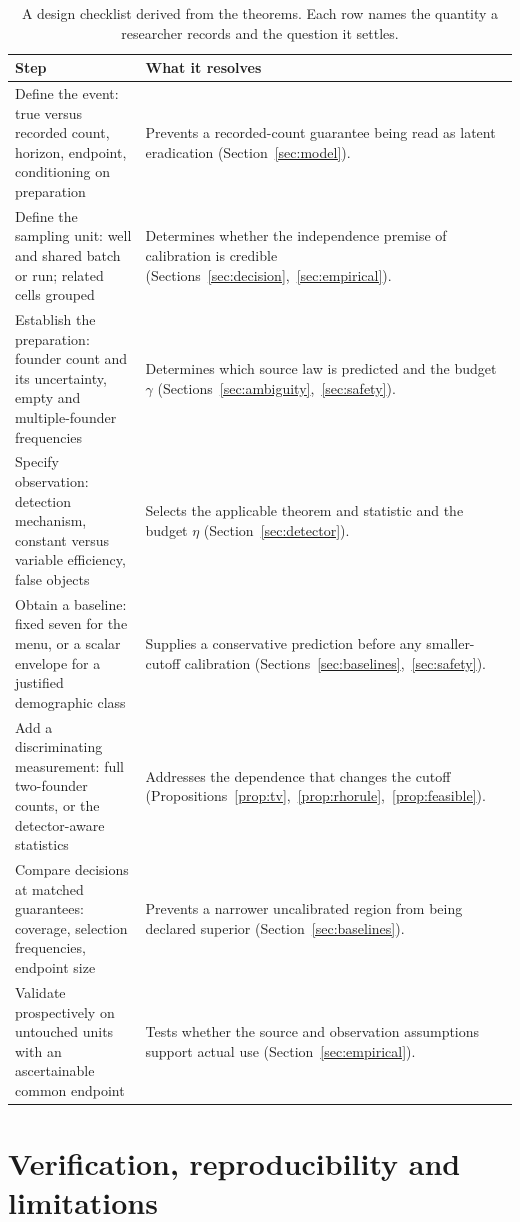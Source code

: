 \documentclass[11pt,a4paper]{article}
\theoremstyle{plain}
\theoremstyle{definition}
\theoremstyle{remark}
\begin{document}
\begin{table}[t]
\centering
\caption{A design checklist derived from the theorems. Each row names the quantity a researcher records and the question it settles.}\label{tab:workflow}
\small
\begin{tabular}{@{}L{0.27\textwidth}L{0.68\textwidth}@{}}
\toprule
Step & What it resolves\\
\midrule
Define the event: true versus recorded count, horizon, endpoint, conditioning on preparation & Prevents a recorded-count guarantee being read as latent eradication (Section~\ref{sec:model}).\\
Define the sampling unit: well and shared batch or run; related cells grouped & Determines whether the independence premise of calibration is credible (Sections~\ref{sec:decision},~\ref{sec:empirical}).\\
Establish the preparation: founder count and its uncertainty, empty and multiple-founder frequencies & Determines which source law is predicted and the budget $\gamma$ (Sections~\ref{sec:ambiguity},~\ref{sec:safety}).\\
Specify observation: detection mechanism, constant versus variable efficiency, false objects & Selects the applicable theorem and statistic and the budget $\eta$ (Section~\ref{sec:detector}).\\
Obtain a baseline: fixed seven for the menu, or a scalar envelope for a justified demographic class & Supplies a conservative prediction before any smaller-cutoff calibration (Sections~\ref{sec:baselines},~\ref{sec:safety}).\\
Add a discriminating measurement: full two-founder counts, or the detector-aware statistics & Addresses the dependence that changes the cutoff (Propositions~\ref{prop:tv},~\ref{prop:rhorule},~\ref{prop:feasible}).\\
Compare decisions at matched guarantees: coverage, selection frequencies, endpoint size & Prevents a narrower uncalibrated region from being declared superior (Section~\ref{sec:baselines}).\\
Validate prospectively on untouched units with an ascertainable common endpoint & Tests whether the source and observation assumptions support actual use (Section~\ref{sec:empirical}).\\
\bottomrule
\end{tabular}
\end{table}

\section{Verification, reproducibility and limitations}\label{sec:verification}
\end{document}
